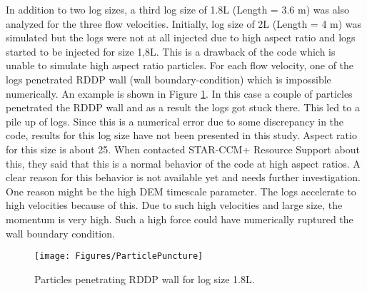 In addition to two log sizes, a third log size of 1.8L (Length  = 3.6 m) was also analyzed for the three flow velocities. Initially, log size of 2L (Length = 4 m) was simulated but the logs were not at all injected due to high aspect ratio and logs started to be injected for size 1,8L. This is a drawback of the code which is unable to simulate high aspect ratio particles. For each flow velocity, one of the logs penetrated RDDP wall (wall boundary-condition) which is impossible numerically. An example is shown in Figure \ref{fig:ParticlePuncture}. In this case a couple of particles penetrated the RDDP wall and as a result the logs got stuck there. This led to a pile up of logs. Since this is a numerical error due to some discrepancy in the code, results for this log size have not been presented in this study. Aspect ratio for this size is about 25. When contacted STAR-CCM+ Resource Support about this, they said that this is a normal behavior of the code at high aspect ratios. A clear reason for this behavior is not available yet and needs further investigation. One reason might be the high DEM timescale parameter. The logs accelerate to high velocities because of this. Due to such high velocities and large size, the momentum is very high. Such a high force could have numerically ruptured the wall boundary condition. 

\begin{figure}
\centering
\texttt{[image: Figures/ParticlePuncture]}
\caption{\label{fig:ParticlePuncture}Particles penetrating RDDP wall for log size 1.8L.}
\end{figure}

